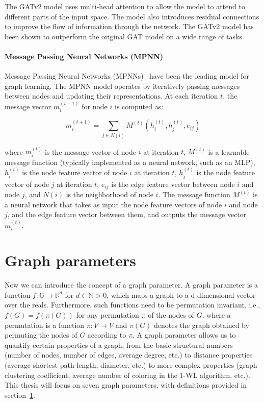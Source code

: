 The GATv2 model uses multi-head attention to allow the model to attend to different parts of the input space. The model also introduces residual connections to improve the flow of information through the network. The GATv2 model has been shown to outperform the original GAT model on a wide range of tasks.

\paragraph{Message Passing Neural Networks (MPNN)}
Message Passing Neural Networks (MPNNs)~\cite{gilmer2017neural} have been the leading model for graph learning. The MPNN model operates by iteratively passing messages between nodes and updating their representations. At each iteration $t$, the message vector $m_i^{(t+1)}$ for node $i$ is computed as:

$$
    m_i^{(t+1)} = \sum_{j\in N(i)}M^{(t)}(h_i^{(t)}, h_j^{(t)}, e_{ij})
$$

where $m_i^{(t)}$ is the message vector of node $i$ at iteration $t$, $M^{(t)}$ is a learnable message function (typically implemented as a neural network, such as an MLP), $h_i^{(t)}$ is the node feature vector of node $i$ at iteration $t$, $h_j^{(t)}$ is the node feature vector of node $j$ at iteration $t$, $e_{ij}$ is the edge feature vector between node $i$ and node $j$, and $N(i)$ is the neighborhood of node $i$. The message function $M^{(t)}$ is a neural network that takes as input the node feature vectors of node $i$ and node $j$, and the edge feature vector between them, and outputs the message vector $m_i^{(t)}$.

\section{Graph parameters} \label{sec:graph_parameters}
Now we can introduce the concept of a graph parameter. A graph parameter is a function $f: \mathbb{G} \rightarrow \mathbb{R}^d$ for $d\in \mathbb{N} >0$, which maps a graph to a d-dimensional vector over the reals. Furthermore, such functions need to be permutation invariant, i.e., $f(G) = f(\pi(G))$ for any permutation $\pi$ of the nodes of $G$, where a permutation is a function $\pi: V \rightarrow V$ and $\pi(G)$ denotes the graph obtained by permuting the nodes of $G$ according to $\pi$. A graph parameter allows us to quantify certain properties of a graph, from the basic structural numbers (number of nodes, number of edges, average degree, etc.) to distance properties (average shortest path length, diameter, etc.) to more complex properties (graph clustering coefficient, average number of coloring in the 1-WL algorithm, etc.). This thesis will focus on seven graph parameters, with definitions provided in section~\ref{sec:graph_parameters}.